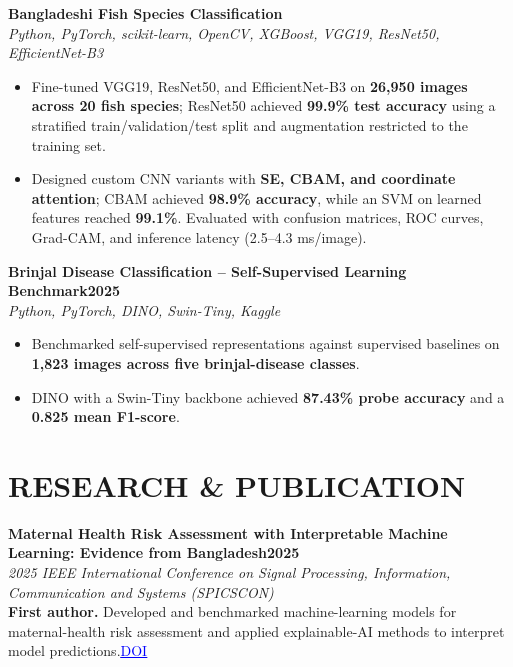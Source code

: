 \documentclass[10pt,a4paper]{article}
\newcommand{\reslink}[2]{\href{#1}{\textcolor{blue}{\underline{#2}}}}
\newcommand{\projectheading}[3]{%
    \vspace{1pt}%
    \textbf{#1}\hfill{\textbf{\small #2}}\\[-1pt]
    {\small\color{muted}\textit{#3}}\\[-2pt]
}
\begin{document}
\projectheading
{Bangladeshi Fish Species Classification}
{}
{Python, PyTorch, scikit-learn, OpenCV, XGBoost, VGG19, ResNet50, EfficientNet-B3}
\begin{itemize}
    \item Fine-tuned VGG19, ResNet50, and EfficientNet-B3 on \textbf{26,950 images across 20 fish species}; ResNet50 achieved \textbf{99.9\% test accuracy} using a stratified train/validation/test split and augmentation restricted to the training set.
    \item Designed custom CNN variants with \textbf{SE, CBAM, and coordinate attention}; CBAM achieved \textbf{98.9\% accuracy}, while an SVM on learned features reached \textbf{99.1\%}. Evaluated with confusion matrices, ROC curves, Grad-CAM, and inference latency (2.5--4.3 ms/image).
\end{itemize}

\projectheading
{Brinjal Disease Classification -- Self-Supervised Learning Benchmark}
{2025}
{Python, PyTorch, DINO, Swin-Tiny, Kaggle}
\begin{itemize}
    \item Benchmarked self-supervised representations against supervised baselines on \textbf{1,823 images across five brinjal-disease classes}.
    \item DINO with a Swin-Tiny backbone achieved \textbf{87.43\% probe accuracy} and a \textbf{0.825 mean F1-score}.
\end{itemize}


\section*{RESEARCH \& PUBLICATION}
\textbf{Maternal Health Risk Assessment with Interpretable Machine Learning: Evidence from Bangladesh}\hfill\textbf{2025}\\[-1pt]
{\small\textit{2025 IEEE International Conference on Signal Processing, Information, Communication and Systems (SPICSCON)}}\\[-2pt]
\small
\textbf{First author.} Developed and benchmarked machine-learning models for maternal-health risk assessment and applied explainable-AI methods to interpret model predictions.\;\reslink{https://doi.org/10.1109/SPICSCON69221.2025.11503932}{DOI}

\end{document}
